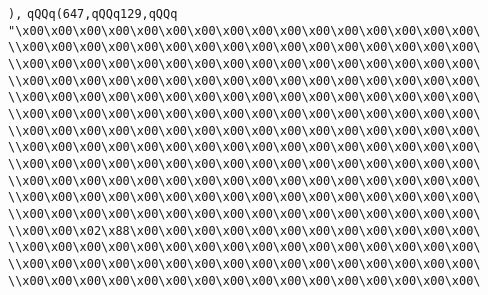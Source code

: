 \verb|),|\newline
\verb|qQQq(647,qQQq129,qQQq|\newline
\verb|"\x00\x00\x00\x00\x00\x00\x00\x00\x00\x00\x00\x00\x00\x00\x00\x00\|\newline
\verb|\\x00\x00\x00\x00\x00\x00\x00\x00\x00\x00\x00\x00\x00\x00\x00\x00\|\newline
\verb|\\x00\x00\x00\x00\x00\x00\x00\x00\x00\x00\x00\x00\x00\x00\x00\x00\|\newline
\verb|\\x00\x00\x00\x00\x00\x00\x00\x00\x00\x00\x00\x00\x00\x00\x00\x00\|\newline
\verb|\\x00\x00\x00\x00\x00\x00\x00\x00\x00\x00\x00\x00\x00\x00\x00\x00\|\newline
\verb|\\x00\x00\x00\x00\x00\x00\x00\x00\x00\x00\x00\x00\x00\x00\x00\x00\|\newline
\verb|\\x00\x00\x00\x00\x00\x00\x00\x00\x00\x00\x00\x00\x00\x00\x00\x00\|\newline
\verb|\\x00\x00\x00\x00\x00\x00\x00\x00\x00\x00\x00\x00\x00\x00\x00\x00\|\newline
\verb|\\x00\x00\x00\x00\x00\x00\x00\x00\x00\x00\x00\x00\x00\x00\x00\x00\|\newline
\verb|\\x00\x00\x00\x00\x00\x00\x00\x00\x00\x00\x00\x00\x00\x00\x00\x00\|\newline
\verb|\\x00\x00\x00\x00\x00\x00\x00\x00\x00\x00\x00\x00\x00\x00\x00\x00\|\newline
\verb|\\x00\x00\x00\x00\x00\x00\x00\x00\x00\x00\x00\x00\x00\x00\x00\x00\|\newline
\verb|\\x00\x00\x02\x88\x00\x00\x00\x00\x00\x00\x00\x00\x00\x00\x00\x00\|\newline
\verb|\\x00\x00\x00\x00\x00\x00\x00\x00\x00\x00\x00\x00\x00\x00\x00\x00\|\newline
\verb|\\x00\x00\x00\x00\x00\x00\x00\x00\x00\x00\x00\x00\x00\x00\x00\x00\|\newline
\verb|\\x00\x00\x00\x00\x00\x00\x00\x00\x00\x00\x00\x00\x00\x00\x00\x00\|\newline
